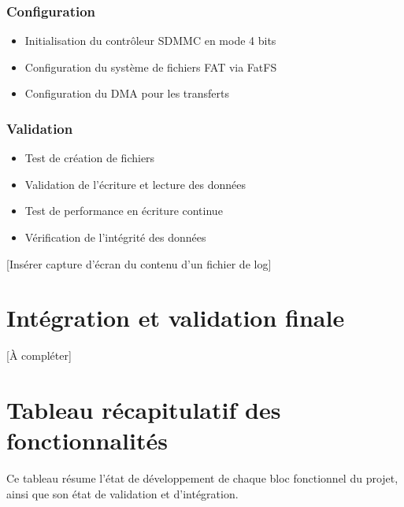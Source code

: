\documentclass[12pt]{article}
\begin{document}
\subsubsection{Configuration}
\begin{itemize}
    \item Initialisation du contrôleur SDMMC en mode 4 bits
    \item Configuration du système de fichiers FAT via FatFS
    \item Configuration du DMA pour les transferts
\end{itemize}

\subsubsection{Validation}
\begin{itemize}
    \item Test de création de fichiers
    \item Validation de l'écriture et lecture des données
    \item Test de performance en écriture continue
    \item Vérification de l'intégrité des données
\end{itemize}

[Insérer capture d'écran du contenu d'un fichier de log]


\section{Intégration et validation finale}
[À compléter]

\section{Tableau récapitulatif des fonctionnalités}

Ce tableau résume l'état de développement de chaque bloc fonctionnel du projet, ainsi que son état de validation et d'intégration.
\end{document}
